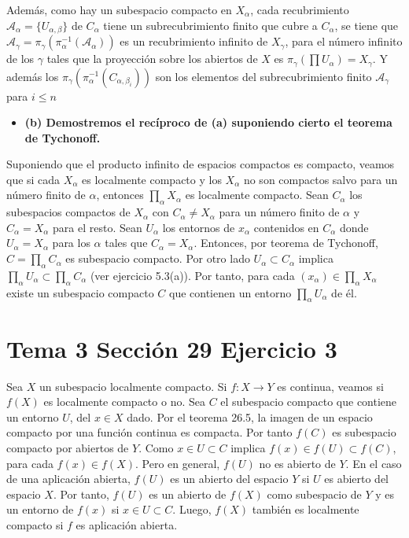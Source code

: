 \documentclass{article}
\begin{document}
Además, como hay un subespacio compacto en $X_\alpha$, cada recubrimiento $\mathcal{A}_\alpha =\{U_{\alpha,\beta}\}$ de $C_\alpha$ tiene un subrecubrimiento finito que cubre a $C_\alpha$, se tiene que $\mathcal{A}_\gamma=\pi_\gamma\left(\pi_\alpha^{-1}\left(\mathcal{A}_\alpha\right)\right)$ es un recubrimiento infinito de $X_\gamma$, para el número infinito de los $\gamma$ tales que la proyección sobre los abiertos de $X$ es $\pi_\gamma\left(\prod U_\alpha\right)=X_\gamma$. Y además los $\pi_\gamma\left(\pi_\alpha^{-1}\left(C_{\alpha,\beta_i}\right)\right)$ son los elementos del subrecubrimiento finito $\mathcal{A}_\gamma$ para $i\leq n$
\begin{itemize}
\item \bf (b) \rm Demostremos el recíproco de (a) suponiendo cierto el teorema de Tychonoff.
\end{itemize}
Suponiendo que el producto infinito de espacios compactos es compacto, veamos que si cada $X_\alpha$ es localmente compacto y los $X_\alpha$ no son compactos salvo para un número finito de $\alpha$, entonces $\prod_\alpha X_\alpha$ es localmente compacto.
Sean $C_\alpha$ los subespacios compactos de $X_\alpha$ con $C_\alpha \neq X_\alpha$ para un número finito de $\alpha$ y $C_\alpha = X_\alpha$ para el resto. Sean $U_\alpha$ los entornos de $x_\alpha$ contenidos en $C_\alpha$ donde $U_\alpha=X_\alpha$ para los $\alpha$ tales que $C_\alpha = X_\alpha$. Entonces, por teorema de Tychonoff, $C=\prod_\alpha C_\alpha$ es subespacio compacto. Por otro lado $U_\alpha\subset C_\alpha$ implica $\prod_\alpha U_\alpha \subset \prod_\alpha C_\alpha$ (ver ejercicio 5.3(a)). Por tanto, para cada $(x_\alpha)\in \prod_\alpha X_\alpha$ existe un subespacio compacto $C$ que contienen un entorno $\prod_\alpha U_\alpha$ de  él.
\section{Tema 3 Sección 29 Ejercicio 3}
Sea $X$ un subespacio localmente compacto. Si $f:X\rightarrow Y$ es continua, veamos si $f(X)$ es localmente compacto o no. Sea $C$ el subespacio compacto que contiene un entorno $U$, del $x\in X$ dado. Por el teorema 26.5, la imagen de un espacio compacto por una función continua es compacta. Por tanto $f(C)$ es subespacio compacto por abiertos de $Y$. Como $x\in U\subset C$ implica $f(x)\in f(U)\subset f(C)$, para cada $f(x)\in f(X)$. Pero en general, $f(U)$ no es abierto de $Y$.
En el caso de una aplicación abierta,  $f(U)$ es un abierto del espacio $Y$ si $U$ es abierto del espacio $X$. Por tanto, $f(U)$ es un abierto de $f(X)$ como subespacio de $Y$ y es un entorno de $f(x)$ si $x\in U\subset C$. Luego, $f(X)$ también es localmente compacto si $f$ es aplicación abierta.
\end{document}
